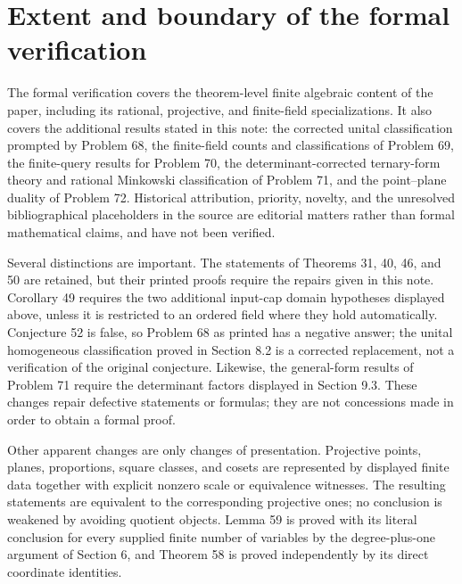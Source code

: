 \documentclass[11pt]{article}
\begin{document}
\section{Extent and boundary of the formal verification}

The formal verification covers the theorem-level finite algebraic content of
the paper, including its rational, projective, and finite-field
specializations.  It also covers the additional results stated in this note:
the corrected unital classification prompted by Problem 68, the finite-field
counts and classifications of Problem 69, the finite-query results for
Problem 70, the determinant-corrected ternary-form theory and rational
Minkowski classification of Problem 71, and the point--plane duality of
Problem 72.  Historical attribution, priority, novelty, and the unresolved
bibliographical placeholders in the source are editorial matters rather than
formal mathematical claims, and have not been verified.

Several distinctions are important.  The statements of Theorems 31, 40, 46,
and 50 are retained, but their printed proofs require the repairs given in
this note.  Corollary 49 requires the two additional input-cap domain
hypotheses displayed above, unless it is restricted to an ordered field where
they hold automatically.  Conjecture 52 is false, so Problem 68 as printed
has a negative answer; the unital homogeneous classification proved in
Section 8.2 is a corrected replacement, not a verification of the original
conjecture.
Likewise, the general-form results of Problem 71 require the determinant
factors displayed in Section 9.3.  These changes repair defective statements
or formulas; they are not concessions made in order to obtain a formal proof.

Other apparent changes are only changes of presentation.  Projective points,
planes, proportions, square classes, and cosets are represented by displayed
finite data together with explicit nonzero scale or equivalence witnesses.
The resulting statements are equivalent to the corresponding projective
ones; no conclusion is weakened by avoiding quotient objects.  Lemma 59 is
proved with its literal conclusion for every supplied finite number of
variables by the degree-plus-one argument of Section 6, and Theorem 58 is
proved independently by its direct coordinate identities.
\end{document}
